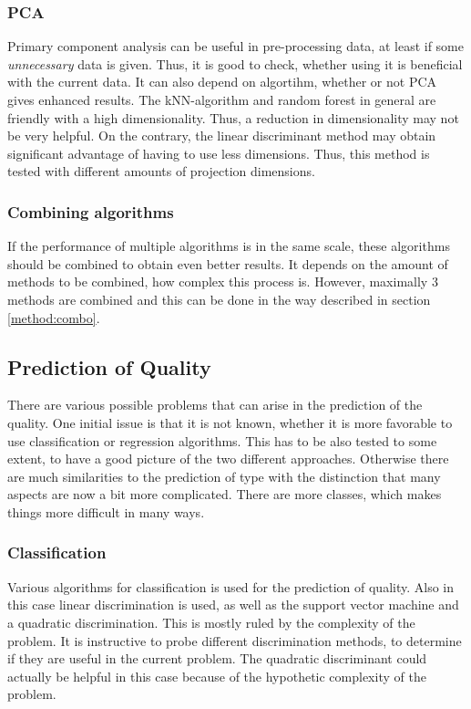 \documentclass[twoside]{article}
\begin{document}
\begin{multicols}{2}
\subsubsection{PCA}

Primary component analysis can be useful in pre-processing data, at least if some \emph{unnecessary} data is given. Thus, it is good to check, whether
using it is beneficial with the current data. It can also depend on algortihm, whether or not PCA gives enhanced results. The kNN-algorithm and random
forest in general are friendly with a high dimensionality. Thus, a reduction in dimensionality may not be very helpful. On the contrary, the linear discriminant
method may obtain significant advantage of having to use less dimensions. Thus, this method is tested with different amounts of projection dimensions.

\subsubsection{Combining algorithms}

If the performance of multiple algorithms is in the same scale, these algorithms should be combined to obtain even better results. It depends on the amount
of methods to be combined, how complex this process is. However, maximally 3 methods are combined and this can be done in the way described in section \ref{method:combo}.

\subsection{Prediction of Quality}

There are various possible problems that can arise in the prediction of the quality. One initial issue is that it is
not known, whether it is more favorable to use classification or regression algorithms. This has to be also tested
to some extent, to have a good picture of the two different approaches. Otherwise there are much similarities to the 
prediction of type with the distinction that many aspects are now a bit more complicated. There are more classes, which
makes things more difficult in many ways.

\subsubsection{Classification}

Various algorithms for classification is used for the prediction of quality. Also in this case linear discrimination is used, as well 
as the support vector machine and a quadratic discrimination. This is mostly ruled by the complexity of the problem. It is instructive
to probe different discrimination methods, to determine if they are useful in the current problem. The quadratic discriminant could
actually be helpful in this case because of the hypothetic complexity of the problem.


\end{multicols}
\end{document}
